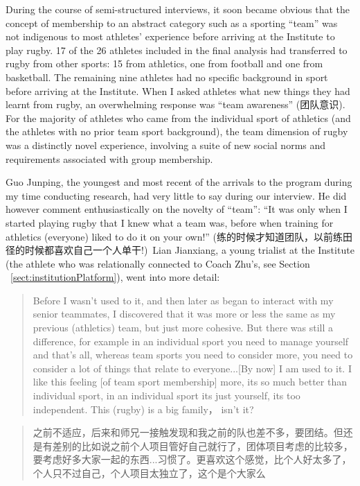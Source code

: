 \begin{CJK}{UTF8}{gbsn}
During the course of semi-structured interviews, it soon became obvious that the concept of membership to an abstract category such as a sporting ``team'' was not indigenous to most athletes' experience before arriving at the Institute to play rugby.  17 of the 26 athletes included in the final analysis had transferred to rugby from other sports: 15 from athletics, one from football and one from basketball.  The remaining nine athletes had no specific background in sport before arriving at the Institute.  When I asked athletes what new things they had learnt from rugby, an overwhelming response was ``team awareness'' (团队意识).  For the majority of athletes who came from the individual sport of athletics (and the athletes with no prior team sport background), the team dimension of rugby was a distinctly novel experience, involving a suite of new social norms and requirements associated with group membership.

Guo Junping, the youngest and most recent of the arrivals to the program during my time conducting research, had very little to say during our interview. He did however comment enthusiastically on the novelty of ``team'': ``It was only when I started playing rugby that I knew what a team was, before when training for athletics (everyone) liked to do it on your own!'' (练的时候才知道团队，以前练田径的时候都喜欢自己一个人单干!) Lian Jianxiang, a young trialist at the Institute (the athlete who was relationally connected to Coach Zhu's, see Section ~\ref{sect:institutionPlatform}), went into more detail:

    \begin{quotation}
     Before I wasn’t used to it, and then later as began to interact with my senior teammates, I discovered that it was more or less the same as my previous (athletics) team, but just more cohesive.  But there was still a difference, for example in an individual sport you need to manage yourself and that's all, whereas team sports you need to consider more, you need to consider a lot of things that relate to everyone...[By now] I am used to it. I like this feeling [of team sport membership] more, its so much better than individual sport, in an individual sport its just yourself, its too independent. This (rugby) is a big family， isn’t it?
    \end{quotation}

    \begin{quotation}
      之前不适应，后来和师兄一接触发现和我之前的队也差不多，要团结。但还是有差别的比如说之前个人项目管好自己就行了，团体项目考虑的比较多，要考虑好多大家一起的东西...习惯了。更喜欢这个感觉，比个人好太多了，个人只不过自己，个人项目太独立了，这个是个大家么 \\
    \end{quotation}


\end{CJK}
